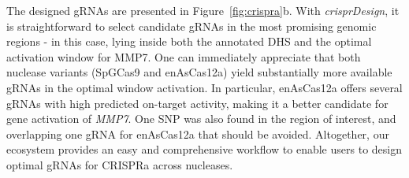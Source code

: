 \documentclass[pdftex,english,10pt]{article}
\begin{document}
The designed gRNAs are presented in Figure~\ref{fig:crispra}b. 
With \textit{crisprDesign}, it is straightforward to select candidate gRNAs in the most promising genomic regions - in this case, lying inside both the annotated DHS and the optimal activation window for MMP7. One can immediately appreciate that both nuclease variants (SpGCas9 and enAsCas12a) yield substantially more available gRNAs in the optimal window activation. In particular, enAsCas12a offers several gRNAs with high predicted on-target activity, making it a better candidate for gene activation of \textit{MMP7}. One SNP was also found in the region of interest, and overlapping one gRNA for enAsCas12a that should be avoided. Altogether, our ecosystem provides an easy and comprehensive workflow to enable users to design optimal gRNAs for CRISPRa across nucleases. 
\end{document}
